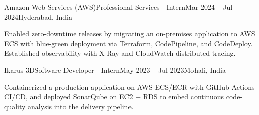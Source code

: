\resumeExp
{Amazon Web Services (AWS)}{Professional Services - Intern}{Mar 2024 -- Jul 2024}{Hyderabad, India}
\resumeItemListStart
    \item[$\diamond$] Enabled zero-downtime releases by migrating an on-premises application to AWS ECS with blue-green deployment via Terraform, CodePipeline, and CodeDeploy. Established observability with X-Ray and CloudWatch distributed tracing.
\resumeItemListEnd

\resumeExp
{Ikarus-3D}{Software Developer - Intern}{May 2023 -- Jul 2023}{Mohali, India}
\resumeItemListStart
    \item[$\diamond$] Containerized a production application on AWS ECS/ECR with GitHub Actions CI/CD, and deployed SonarQube on EC2 + RDS to embed continuous code-quality analysis into the delivery pipeline.
\resumeItemListEnd

\resumeSubHeadingListEnd
